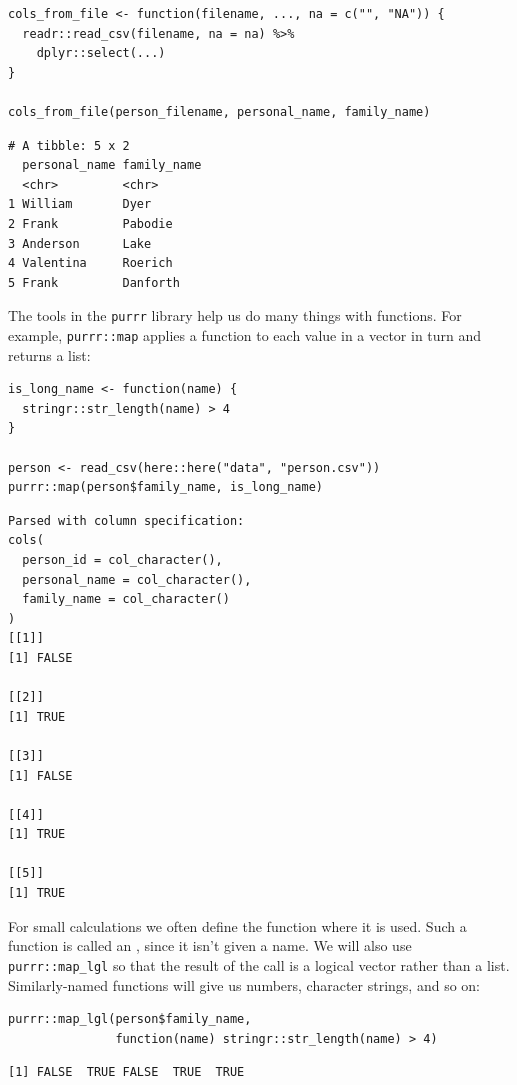 \begin{lstlisting}
cols_from_file <- function(filename, ..., na = c("", "NA")) {
  readr::read_csv(filename, na = na) %>%
    dplyr::select(...)
}

cols_from_file(person_filename, personal_name, family_name)
\end{lstlisting}

\begin{lstlisting}
# A tibble: 5 x 2
  personal_name family_name
  <chr>         <chr>      
1 William       Dyer       
2 Frank         Pabodie    
3 Anderson      Lake       
4 Valentina     Roerich    
5 Frank         Danforth   
\end{lstlisting}

The tools in the \texttt{purrr} library help us do many things with functions.
For example,
\texttt{purrr::map} applies a function to each value in a vector in turn
and returns a list:

\begin{lstlisting}
is_long_name <- function(name) {
  stringr::str_length(name) > 4
}

person <- read_csv(here::here("data", "person.csv"))
purrr::map(person$family_name, is_long_name)
\end{lstlisting}

\begin{lstlisting}
Parsed with column specification:
cols(
  person_id = col_character(),
  personal_name = col_character(),
  family_name = col_character()
)
[[1]]
[1] FALSE

[[2]]
[1] TRUE

[[3]]
[1] FALSE

[[4]]
[1] TRUE

[[5]]
[1] TRUE
\end{lstlisting}

For small calculations we often define the function where it is used.
Such a function is called an ,
since it isn't given a name.
We will also use \texttt{purrr::map\_lgl}
so that the result of the call is a logical vector rather than a list.
Similarly-named functions will give us numbers, character strings, and so on:

\begin{lstlisting}
purrr::map_lgl(person$family_name,
               function(name) stringr::str_length(name) > 4)
\end{lstlisting}

\begin{lstlisting}
[1] FALSE  TRUE FALSE  TRUE  TRUE
\end{lstlisting}

